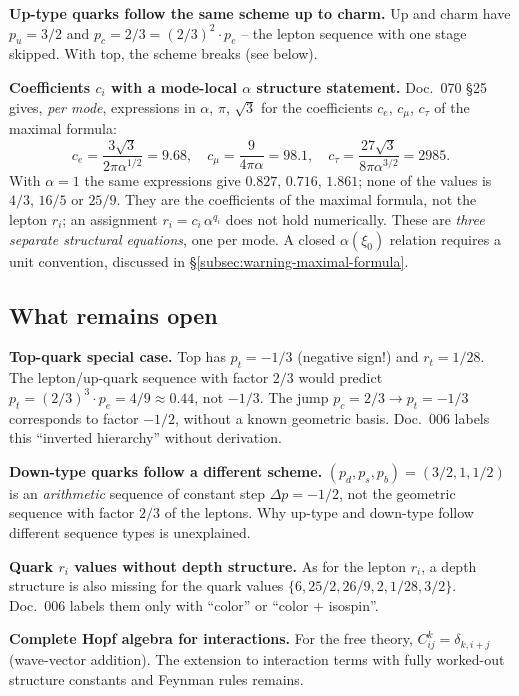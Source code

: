 \textbf{Up-type quarks follow the same scheme up to charm.}
Up and charm have $p_u = 3/2$ and $p_c = 2/3 = (2/3)^2 \cdot p_e$
-- the lepton sequence with one stage skipped. With top, the
scheme breaks (see below).

\textbf{Coefficients $c_i$ with a mode-local $\alpha$ structure statement.}
Doc.~070 §25 gives, \emph{per mode}, expressions in $\alpha$, $\pi$,
$\sqrt{3}$ for the coefficients $c_e$, $c_\mu$, $c_\tau$ of the
maximal formula:
\begin{equation}
  c_e = \frac{3\sqrt{3}}{2\pi\alpha^{1/2}} = 9.68, \quad
  c_\mu = \frac{9}{4\pi\alpha} = 98.1, \quad
  c_\tau = \frac{27\sqrt{3}}{8\pi\alpha^{3/2}} = 2985.
\end{equation}
With $\alpha = 1$ the same expressions give $0.827$, $0.716$, $1.861$; none of the values is $4/3$, $16/5$ or $25/9$. They are the coefficients of the maximal formula, not the lepton $r_i$; an assignment $r_i = c_i\,\alpha^{q_i}$ does not hold numerically.
These are \emph{three separate structural equations}, one per mode.
A closed $\alpha(\xi_0)$ relation requires a unit convention,
discussed in §\ref{subsec:warning-maximal-formula}.

\subsection{What remains open}

\textbf{Top-quark special case.}
Top has $p_t = -1/3$ (negative sign!) and $r_t = 1/28$. The
lepton/up-quark sequence with factor $2/3$ would predict
$p_t = (2/3)^3 \cdot p_e = 4/9 \approx 0.44$, not $-1/3$. The jump
$p_c = 2/3 \to p_t = -1/3$ corresponds to factor $-1/2$, without a
known geometric basis. Doc.~006 labels this \enquote{inverted
hierarchy} without derivation.

\textbf{Down-type quarks follow a different scheme.}
$(p_d, p_s, p_b) = (3/2, 1, 1/2)$ is an \emph{arithmetic} sequence
of constant step $\Delta p = -1/2$, not the geometric sequence with
factor $2/3$ of the leptons. Why up-type and down-type follow
different sequence types is unexplained.

\textbf{Quark $r_i$ values without depth structure.}
As for the lepton $r_i$, a depth structure is also missing
for the quark values $\{6, 25/2, 26/9, 2, 1/28, 3/2\}$. Doc.~006
labels them only with \enquote{color} or \enquote{color + isospin}.

\textbf{Complete Hopf algebra for interactions.}
For the free theory, $C^k_{ij} = \delta_{k,i+j}$ (wave-vector
addition). The extension to interaction terms with fully worked-out
structure constants and Feynman rules remains.

